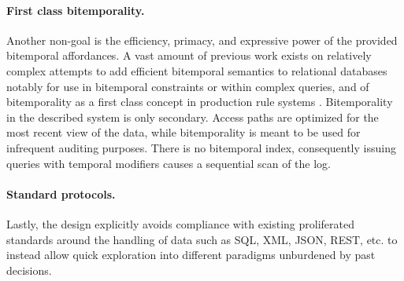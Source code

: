\paragraph{First class bitemporality.}
Another non-goal is the efficiency, primacy, and expressive power of the provided bitemporal affordances. A vast amount of previous work exists on relatively complex attempts to add efficient bitemporal semantics to relational databases \cite{snodgrass1996adding,jensen1999temporal,kulkarni2012temporal} notably for use in bitemporal constraints \cite{doucet1997using} or within complex queries, and of bitemporality as a first class concept in production rule systems \cite{aref2015design}. Bitemporality in the described system is only secondary. Access paths are optimized for the most recent view of the data, while bitemporality is meant to be used for infrequent auditing purposes. There is no bitemporal index, consequently issuing queries with temporal modifiers causes a sequential scan of the log.

\paragraph{Standard protocols.}
Lastly, the design explicitly avoids compliance with existing proliferated standards around the handling of data such as SQL, \gls{XML}, \gls{JSON}, \gls{REST}, etc. to instead allow quick exploration into different paradigms unburdened by past decisions.

